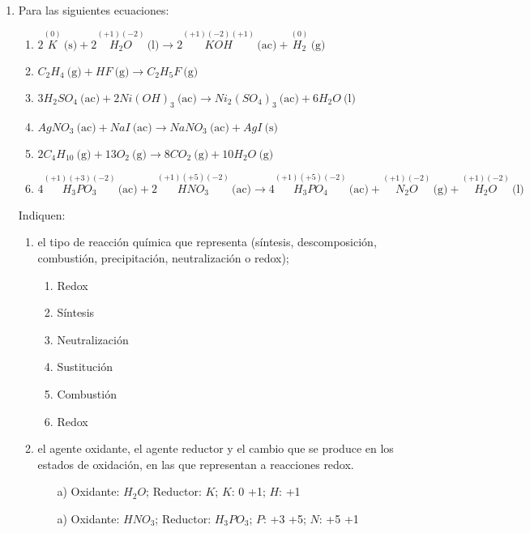 \documentclass[../Práctica.root.tex]{subfiles}
\newcommand{\lra}{\ensuremath{\longrightarrow{}}}
\newcommand{\sr}[2]{\stackrel{#1}{#2}}
\newcommand{\eac}{\ \text{(ac)}}
\newcommand{\es}{\ \text{(s)}}
\newcommand{\el}{\ \text{(l)}}
\newcommand{\eg}{\ \text{(g)}}
\begin{document}
\begin{enumerate}
    \item Para las siguientes ecuaciones:
          \begin{enumerate}
              \item $2 \sr{(0)}{K} \es + 2 \sr{(+1)(-2)}{H_2O} \el \lra 2 \sr{(+1)(-2)(+1)}{KOH} \eac + \sr{(0)}{H_2} \eg$
              \item $C_2H_4 \eg + HF \eg \lra C_2H_5F \eg$
              \item $3 H_2SO_4 \eac + 2 Ni(OH)_3 \eac \lra Ni_2(SO_4)_3 \eac + 6 H_2O \el$
              \item $AgNO_3 \eac + NaI \eac \lra NaNO_3 \eac + AgI \es$
              \item $2 C_4H_{10} \eg + 13 O_2 \eg \lra 8 CO_2 \eg + 10 H_2O \eg$
              \item $4 \sr{(+1)(+3)(-2)}{H_3PO_3} \eac + 2 \sr{(+1)(+5)(-2)}{HNO_3} \eac
                        \lra 4 \sr{(+1)(+5)(-2)}{H_3PO_4} \eac + \sr{(+1)(-2)}{N_2O} \eg + \sr{(+1)(-2)}{H_2O} \el$
          \end{enumerate}
          Indiquen:
          \begin{enumerate}
              \item el tipo de reacción química que representa (síntesis, descomposición, combustión,
                    precipitación, neutralización o redox);
                    \begin{enumerate}[label=\alph*)]
                        \item Redox
                        \item Síntesis
                        \item Neutralización
                        \item Sustitución %
                        \item Combustión
                        \item Redox
                    \end{enumerate}
              \item el agente oxidante, el agente reductor y el cambio que se produce en los estados de
                    oxidación, en las que representan a reacciones redox.
                    \begin{enumerate}
                        \item[a)] Oxidante: $H_2O$; Reductor: $K$; $K$: 0 \rightarrow +1;  $H$: +1 
                        \item[a)] Oxidante: $HNO_3$; Reductor: $H_3PO_3$; $P$: +3 \rightarrow +5;  $N$: +5 \rightarrow +1
                    \end{enumerate}
          \end{enumerate}


\end{enumerate}
\end{document}
